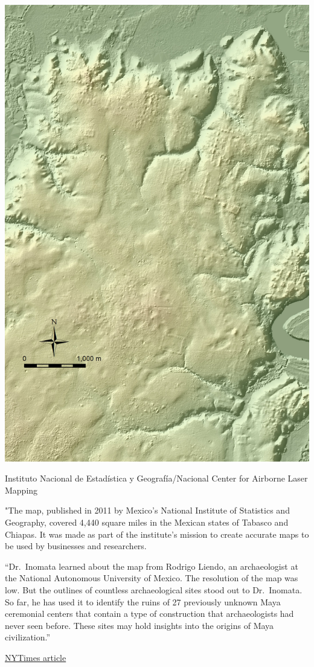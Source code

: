 \documentclass[
]{book}
\begin{document}
\includegraphics[width=18.99in]{www/mayan-ruins}

Instituto Nacional de Estadística y Geografía/Nacional Center for Airborne Laser Mapping

"The map, published in 2011 by Mexico's National Institute of Statistics and Geography, covered 4,440 square miles in the Mexican states of Tabasco and Chiapas. It was made as part of the institute's mission to create accurate maps to be used by businesses and researchers.

``Dr.~Inomata learned about the map from Rodrigo Liendo, an archaeologist at the National Autonomous University of Mexico. The resolution of the map was low. But the outlines of countless archaeological sites stood out to Dr.~Inomata. So far, he has used it to identify the ruins of 27 previously unknown Maya ceremonial centers that contain a type of construction that archaeologists had never seen before. These sites may hold insights into the origins of Maya civilization.''

\href{https://www.nytimes.com/2019/10/08/science/archaeology-lidar-maya.html}{NYTimes article}
\end{document}
